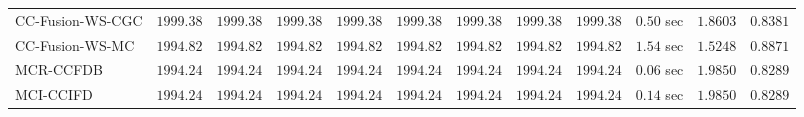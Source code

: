\begin{table}[H]
\begin{tabular}{lrrrrrrrrrrr}
    CC-Fusion-WS-CGC & $      1999.38$ & $      1999.38$ & $      1999.38$ & $      1999.38$ & $      1999.38$ & $      1999.38$ & $      1999.38$ & $      1999.38$ & $         0.50$ sec    & $       1.8603$  & $       0.8381$ \\ 
     CC-Fusion-WS-MC & $      1994.82$ & $      1994.82$ & $      1994.82$ & $      1994.82$ & $      1994.82$ & $      1994.82$ & $      1994.82$ & $      1994.82$ & $         1.54$ sec    & $       1.5248$  & $       0.8871$ \\ 
\cmidrule{1-1} 
           MCR-CCFDB & $      1994.24$ & $      1994.24$ & $      1994.24$ & $      1994.24$ & $      1994.24$ & $      1994.24$ & $      1994.24$ & $      1994.24$ & $         0.06$ sec    & $       1.9850$  & $       0.8289$ \\ 
\cmidrule{1-1} 
           MCI-CCIFD & $      1994.24$ & $      1994.24$ & $      1994.24$ & $      1994.24$ & $      1994.24$ & $      1994.24$ & $      1994.24$ & $      1994.24$ & $         0.14$ sec    & $       1.9850$  & $       0.8289$ \\ 
\bottomrule
\end{tabular}
\end{table}

